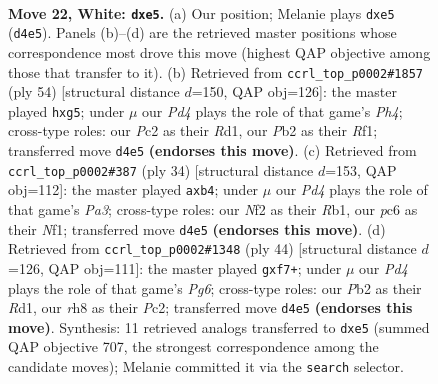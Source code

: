 \documentclass[11pt]{article}
\begin{document}
\clearpage

\begin{figure}[p]\centering
\begin{subfigure}{0.46\textwidth}\centering
\resizebox{\linewidth}{!}{%
\newchessgame
\chessboard[
  setfen={rnb3kr/3n4/2p5/pp1pp1q1/3P2p1/2N5/PPP1BNQP/1K1R3R w - - 0 22},
  showmover=false,
  pgfstyle=straightmove, color=movearrow, markmove={d4-e5}
]}
\caption{}
\end{subfigure}\hfill
\begin{subfigure}{0.46\textwidth}\centering
\resizebox{\linewidth}{!}{%
\newchessgame
\chessboard[
  setfen={r1r4k/1q4bp/p4p1n/Qpn1p1p1/4P2P/2N3B1/P3BPP1/3R1RK1 w - - 0 28},
  showmover=false,
  pgfstyle=straightmove, color=movearrow, markmove={h4-g5}
]}
\caption{}
\end{subfigure}
\\[4pt]
\begin{subfigure}{0.46\textwidth}\centering
\resizebox{\linewidth}{!}{%
\newchessgame
\chessboard[
  setfen={r2qr1k1/bpp2pp1/2n2n1p/4p3/1p2P3/PQP2N1P/3B1PP1/1R2RNK1 w - - 0 18},
  showmover=false,
  pgfstyle=straightmove, color=movearrow, markmove={a3-b4}
]}
\caption{}
\end{subfigure}\hfill
\begin{subfigure}{0.46\textwidth}\centering
\resizebox{\linewidth}{!}{%
\newchessgame
\chessboard[
  setfen={1r2k3/4bpp1/pqbpp1Pr/2n4p/3RPP2/1NN4Q/1PP1B2P/2KR4 w - - 3 23},
  showmover=false,
  pgfstyle=straightmove, color=movearrow, markmove={g6-f7}
]}
\caption{}
\end{subfigure}
\caption{\textbf{Move 22, White: \texttt{dxe5}.} (a) Our position; Melanie plays \texttt{dxe5} (\texttt{d4e5}). Panels (b)--(d) are the retrieved master positions whose correspondence most drove this move (highest QAP objective among those that transfer to it). (b) Retrieved from \texttt{ccrl\_top\_p0002\#1857} (ply 54) [structural distance $d$=150, QAP obj=126]: the master played \texttt{hxg5}; under $\mu$ our \emph{Pd4} plays the role of that game's \emph{Ph4}; cross-type roles: our \emph{P}c2 as their \emph{R}d1, our \emph{P}b2 as their \emph{R}f1; transferred move \texttt{d4e5} \textbf{(endorses this move)}. (c) Retrieved from \texttt{ccrl\_top\_p0002\#387} (ply 34) [structural distance $d$=153, QAP obj=112]: the master played \texttt{axb4}; under $\mu$ our \emph{Pd4} plays the role of that game's \emph{Pa3}; cross-type roles: our \emph{N}f2 as their \emph{R}b1, our \emph{p}c6 as their \emph{N}f1; transferred move \texttt{d4e5} \textbf{(endorses this move)}. (d) Retrieved from \texttt{ccrl\_top\_p0002\#1348} (ply 44) [structural distance $d$=126, QAP obj=111]: the master played \texttt{gxf7+}; under $\mu$ our \emph{Pd4} plays the role of that game's \emph{Pg6}; cross-type roles: our \emph{P}b2 as their \emph{R}d1, our \emph{r}h8 as their \emph{P}c2; transferred move \texttt{d4e5} \textbf{(endorses this move)}. Synthesis: 11 retrieved analogs transferred to \texttt{dxe5} (summed QAP objective 707, the strongest correspondence among the candidate moves); Melanie committed it via the \texttt{search} selector.}
\label{fig:thought-m42}
\end{figure}
\end{document}
